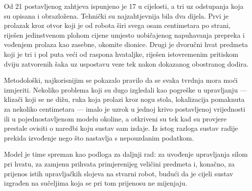 \documentclass[12pt,a4paper]{article}
\begin{document}
Od 21 postavljenog zahtjeva ispunjeno je 17 u cijelosti, a tri uz odstupanja koja su opisana i
obrazložena. Tehnički su najzahtjevnija bila dva dijela. Prvi je prolazak kroz otvor koji je od
robota širi svega osam centimetara po strani, riješen jedinstvenom plohom cijene umjesto
uobičajenog napuhavanja prepreka i vođenjem prolaza kao zasebne, okomite dionice. Drugi je
dvoručni hvat predmeta koji je tri i pol puta veći od raspona hvataljke, riješen istovremenim
pritiskom dviju zatvorenih šaka uz uspostavu veze tek nakon dokazanog obostranog dodira.

Metodološki, najkorisnijim se pokazalo pravilo da se svaka tvrdnja mora moći izmjeriti. Nekoliko
problema koji su dugo izgledali kao pogreške u upravljanju --- klizači koji se ne dižu, ruka koja
prolazi kroz nogu stola, lokalizacija pomaknuta za nekoliko centimetara --- imalo je uzrok u
jednoj krivo postavljenoj vrijednosti ili u pojednostavljenom modelu okoline, a otkriveni su tek
kad su provjere prestale ovisiti o naredbi koju sustav sam izdaje. Iz istog razloga sustav radije
prekida izvođenje nego što nastavlja s nepouzdanim podatkom.

Model je time spreman kao podloga za daljnji rad: za uvođenje upravljanja silom pri hvatu, za
zamjenu prihvata primjerenijeg veličini predmeta i, konačno, za prijenos istih upravljačkih
slojeva na stvarni robot, budući da je cijeli sustav izgrađen na sučeljima koja se pri tom
prijenosu ne mijenjaju.
\end{document}
